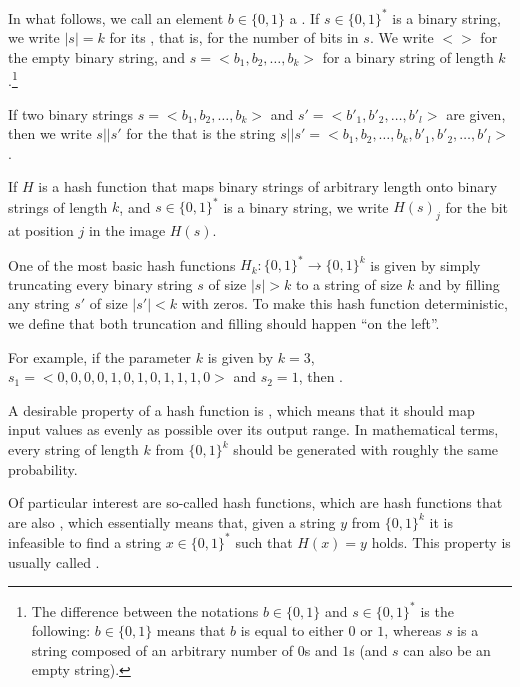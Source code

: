 \begin{notation}
\label{string_and_hash_notations}
In what follows, we call an element $b\in\{0,1\}$ a . If $s\in\{0,1\}^*$ is a binary string, we write $|s|=k$ for its , that is, for the number of bits in $s$. We write $<>$ for the empty binary string, and $s=<b_1,b_2,\ldots,b_k>$ for a binary string of length $k$.\footnote{The difference between the notations $b\in\{0,1\}$ and $s\in\{0,1\}^*$ is the following: $b\in\{0,1\}$ means that $b$ is equal to either $0$ or $1$, whereas $s$ is a string composed of an arbitrary number of $0$s and $1$s (and $s$ can also be an empty string).}

If two binary strings $s=<b_1,b_2,\ldots,b_k>$ and $s'=<b'_1,b'_2,\ldots,b'_l>$ are given, then we write $s||s'$ for the  that is the string 
$s||s'=<b_1,b_2,\ldots,b_k,b'_1,b'_2,\ldots,b'_l>$.

If $H$ is a hash function that maps binary strings of arbitrary length onto binary strings of length $k$, and $s\in\{0,1\}^*$ is a binary string, we write $H(s)_j$ for the bit at position $j$ in the image $H(s)$.
\end{notation}

\begin{example}\label{ex:k-truncation-hash} One of the most basic hash functions $H_k:\{0,1\}^*\to \{0,1\}^k$ is given by simply truncating every binary string $s$ of size $|s|> k$ to a string of size $k$ and by filling any string $s'$ of size $|s'|<k$ with zeros. To make this hash function deterministic, we define that both truncation and filling should happen ``on the left''.

For example, if the parameter $k$ is given by $k=3$, $s_1=<0,0,0,0,1,0,1,0,1,1,1,0>$ and $s_2=1$, then .
\end{example}

A desirable property of a hash function is , which means that it should map input values as evenly as possible over its output range. In mathematical terms, every string of length $k$  from $\{0,1\}^k$ should be generated with roughly the same probability.

Of particular interest are so-called  hash functions, which are hash functions that are also , which essentially means that, given a string $y$ from $\{0,1\}^k$ it is infeasible to find a string $x\in\{0,1\}^*$ such that $H(x)=y$ holds. This property is usually called .

